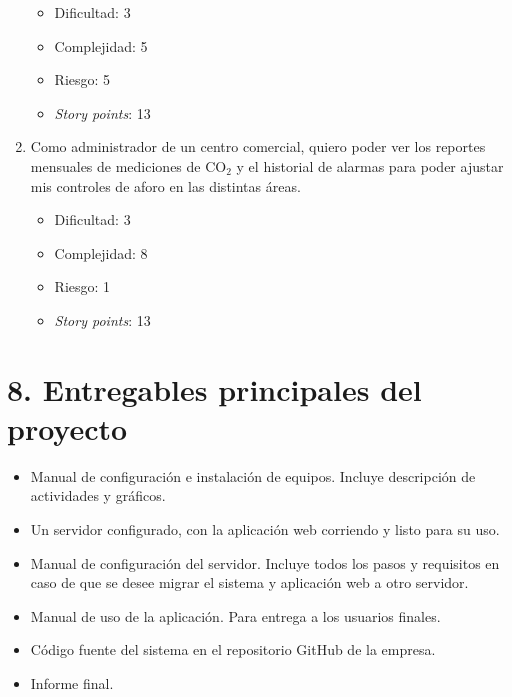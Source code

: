 \documentclass[
11pt, %
]{charter}
\begin{document}
\begin{enumerate}
 	\begin{itemize}
 		\item Dificultad: 3
 		\item Complejidad: 5
	 	\item Riesgo: 5
	 	\item \textit{Story points}: 13
 	\end{itemize} 
 	\item Como administrador de un centro comercial, quiero poder ver los reportes mensuales de mediciones de CO$_{2}$ y el historial de alarmas para poder ajustar mis controles de aforo en las distintas áreas. 
 	\begin{itemize}
 		\item Dificultad: 3
 		\item Complejidad: 8
	 	\item Riesgo: 1
	 	\item \textit{Story points}: 13
 	\end{itemize} 
\end{enumerate}
\section{8. Entregables principales del proyecto}
\label{sec:entregables}

\begin{itemize}
	\item Manual de configuración e instalación de equipos. Incluye descripción de actividades y gráficos.
	\item Un servidor configurado, con la aplicación web corriendo y listo para su uso.
	\item Manual de configuración del servidor. Incluye todos los pasos y requisitos en caso de que se desee migrar el sistema y aplicación web a otro servidor.
	\item Manual de uso de la aplicación. Para entrega a los usuarios finales.
	\item Código fuente del sistema en el repositorio GitHub de la empresa.
	\item Informe final.
\end{itemize}
\end{document}
